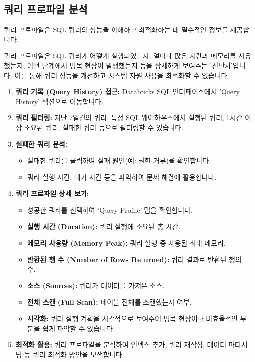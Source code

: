 \documentclass[11pt,a4paper]{article}
\begin{document}
\subsection{쿼리 프로파일 분석}
쿼리 프로파일은 SQL 쿼리의 성능을 이해하고 최적화하는 데 필수적인 정보를 제공합니다.

\begin{tcolorbox}[mybox={핵심 요약: 쿼리 성능 진단서}]
쿼리 프로파일은 SQL 쿼리가 어떻게 실행되었는지, 얼마나 많은 시간과 메모리를 사용했는지, 어떤 단계에서 병목 현상이 발생했는지 등을 상세하게 보여주는 '진단서'입니다. 이를 통해 쿼리 성능을 개선하고 시스템 자원 사용을 최적화할 수 있습니다.
\end{tcolorbox}

\begin{enumerate}
    \item \textbf{쿼리 기록 (Query History) 접근:} Databricks SQL 인터페이스에서 'Query History' 섹션으로 이동합니다.
    \item \textbf{쿼리 필터링:} 지난 7일간의 쿼리, 특정 SQL 웨어하우스에서 실행된 쿼리, 1시간 이상 소요된 쿼리, 실패한 쿼리 등으로 필터링할 수 있습니다.
    \item \textbf{실패한 쿼리 분석:}
    \begin{itemize}
        \item 실패한 쿼리를 클릭하여 실패 원인(예: 권한 거부)을 확인합니다.
        \item 쿼리 실행 시간, 대기 시간 등을 파악하여 문제 해결에 활용합니다.
    \end{itemize}
    \item \textbf{쿼리 프로파일 상세 보기:}
    \begin{itemize}
        \item 성공한 쿼리를 선택하여 'Query Profile' 탭을 확인합니다.
        \item \textbf{실행 시간 (Duration):} 쿼리 실행에 소요된 총 시간.
        \item \textbf{메모리 사용량 (Memory Peak):} 쿼리 실행 중 사용된 최대 메모리.
        \item \textbf{반환된 행 수 (Number of Rows Returned):} 쿼리 결과로 반환된 행의 수.
        \item \textbf{소스 (Sources):} 쿼리가 데이터를 가져온 소스.
        \item \textbf{전체 스캔 (Full Scan):} 테이블 전체를 스캔했는지 여부.
        \item \textbf{시각화:} 쿼리 실행 계획을 시각적으로 보여주어 병목 현상이나 비효율적인 부분을 쉽게 파악할 수 있습니다.
    \end{itemize}
    \item \textbf{최적화 활용:} 쿼리 프로파일을 분석하여 인덱스 추가, 쿼리 재작성, 데이터 파티셔닝 등 쿼리 최적화 방안을 모색합니다.
\end{enumerate}
\end{document}
